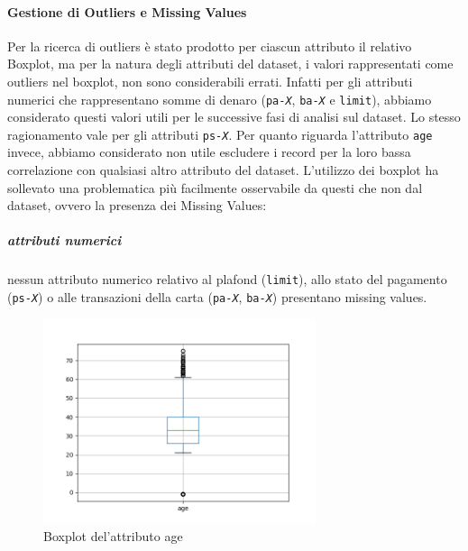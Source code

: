\paragraph{Gestione di Outliers e Missing Values}
Per la ricerca di outliers \`e stato prodotto per ciascun
attributo il relativo Boxplot, ma per la natura degli attributi
del dataset, i valori rappresentati come outliers nel boxplot,
non sono considerabili errati. Infatti per gli attributi numerici
che rappresentano somme di denaro (\texttt{pa-\textit{X}},
\texttt{ba-\textit{X}} e \texttt{limit}), abbiamo considerato
questi valori utili per le successive fasi di analisi sul
dataset. Lo stesso ragionamento vale per gli attributi 
\texttt{ps-\textit{X}}. Per quanto riguarda l'attributo
\texttt{age} invece, abbiamo considerato non utile escludere i record
per la loro bassa correlazione con qualsiasi altro attributo
del dataset. L'utilizzo dei boxplot ha sollevato una problematica
pi\`u facilmente osservabile da questi che non dal dataset, ovvero la presenza
dei Missing Values:

\subparagraph{attributi numerici}
 nessun attributo numerico relativo al plafond (\texttt{limit}), allo stato del pagamento (\texttt{ps-\textit{X}}) o alle transazioni della carta (\texttt{pa-\textit{X}}, \texttt{ba-\textit{X}}) presentano missing values.
 
\begin{figure}
\centering
\includegraphics[width=8cm]{img/age-boxplot.png}
\caption{Boxplot del'attributo age}
\end{figure}

